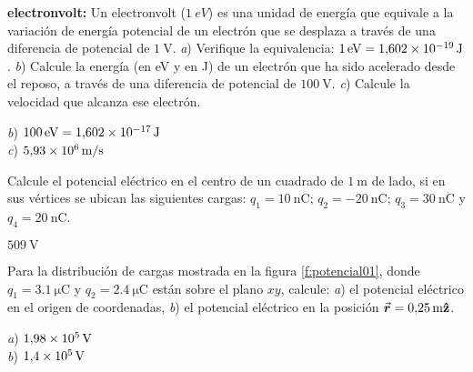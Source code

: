 %
\begin{Exercise}
  \textbf{electronvolt:} Un electronvolt ($\SI{1}{eV}$) es una unidad de energía que equivale a la variación de energía potencial de un electrón que se desplaza a través de una diferencia de potencial de $\SI{1}{\volt}$. \textit{a}) Verifique la equivalencia: $\SI{1}{eV} = \SI{1.602E-19}{\joule}$. \textit{b}) Calcule la energía (en eV y en J) de un electrón que ha sido acelerado desde el reposo, a través de una diferencia de potencial de $\SI{100}{\volt}$. \textit{c}) Calcule la velocidad que alcanza ese electrón.
\end{Exercise}
\begin{Answer}
	\begin{minipage}[t]{.4\textwidth}
    \textit{b}) $\SI{100}{eV} = \SI{1.602E-17}{\joule}$\\ \textit{c}) $\SI{5.93E6}{\metre/\second}$
  \end{minipage}
\end{Answer}
%
\begin{Exercise}
  Calcule el potencial eléctrico en el centro de un cuadrado de $\SI{1}{\metre}$ de lado, si en sus vértices se ubican las siguientes cargas: $q_1 = \SI{10}{\nano\coulomb}$; $q_2 = \SI{-20}{\nano\coulomb}$; $q_3 = \SI{30}{\nano\coulomb}$ y $q_4 = \SI{20}{\nano\coulomb}$.
\end{Exercise}
\begin{Answer}
  $\SI{509}{\volt}$
\end{Answer}
%
\begin{Exercise}\label{p:potencial01}
  Para la distribución de cargas mostrada en la figura \ref{f:potencial01}, donde $q_1 = \SI{3.1}{\micro\coulomb}$ y $q_2 = \SI{2.4}{\micro\coulomb}$ están sobre el plano $xy$, calcule: \textit{a}) el potencial eléctrico en el origen de coordenadas, \textit{b}) el potencial eléctrico en la posición $\va*{r} =\SI{0.25}{\metre}\vu{z}$.
\end{Exercise}
\begin{Answer}
	\begin{minipage}[t]{.4\textwidth}
    \textit{a}) $\SI{1.98E5}{\volt}$\\ \textit{b}) $\SI{1.4E5}{\volt}$
  \end{minipage}
\end{Answer}
%
\begin{center}
\end{center}

